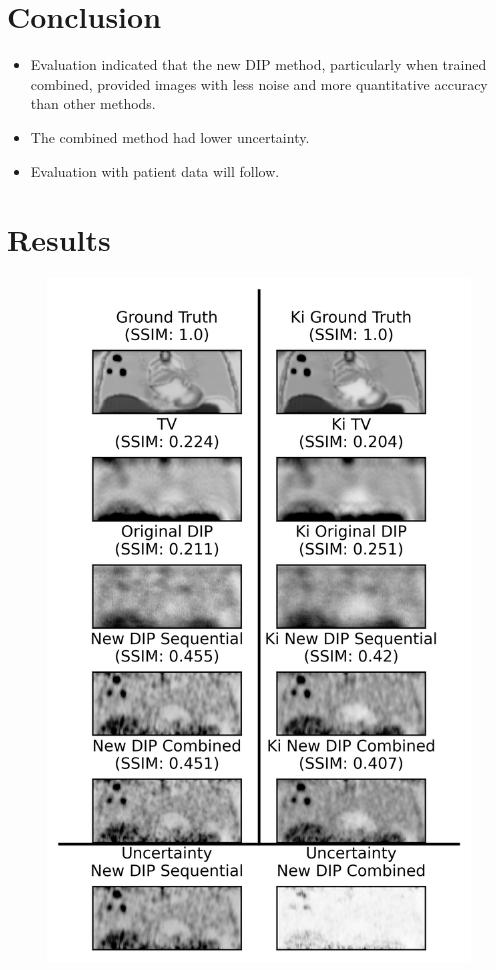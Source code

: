 \documentclass[portrait, color=UCLburgundy, margin=1cm]{uclposter}
\begin{document}
\begin{multicols}{2}
        \section*{Conclusion}
            \begin{highlightbox}[UCLlightgreen]
                \begin{itemize}
                    \item Evaluation indicated that the new \gls{DIP} method, particularly when trained combined, provided images with less noise and more quantitative accuracy than other methods.
                    \item The combined method had lower uncertainty.
                    \item Evaluation with patient data will follow.
                \end{itemize}
            \end{highlightbox}
        
        \AtNextBibliography{\tiny}
        \printbibliography
        
        \section*{Results}
            \begin{figure}[H]
                \centering
                
                \includegraphics[width=0.9\linewidth]{visual_analysis.png}
                

\end{figure}
\end{multicols}
\end{document}
